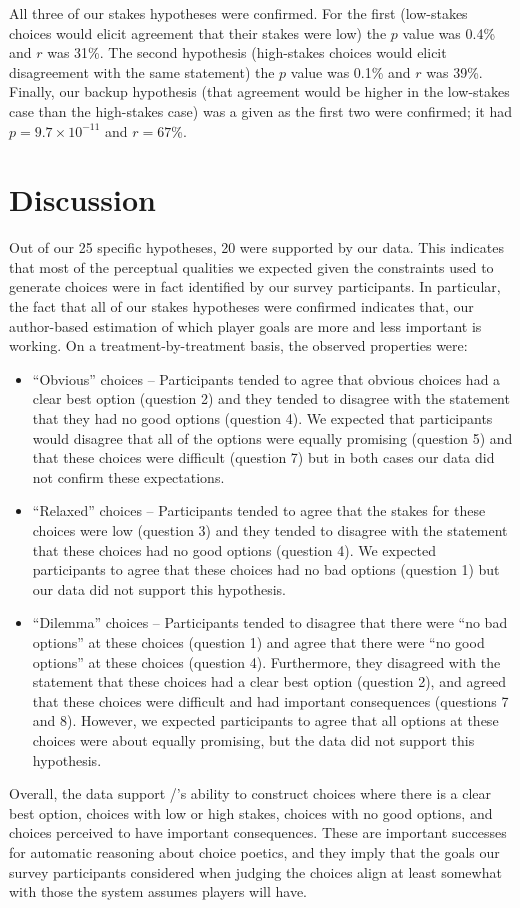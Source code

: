 All three of our stakes hypotheses were confirmed.
%
For the first (low-stakes choices would elicit agreement that their stakes were low) the $p$ value was 0.4\% and $r$ was 31\%.
%
The second hypothesis (high-stakes choices would elicit disagreement with the same statement) the $p$ value was 0.1\% and $r$ was 39\%.
%
Finally, our backup hypothesis (that agreement would be higher in the low-stakes case than the high-stakes case) was a given as the first two were confirmed; it had $p = 9.7\times10^{-11}$ and $r = 67$\%.

\section{Discussion}

Out of our 25 specific hypotheses, 20 were supported by our data.
%
This indicates that most of the perceptual qualities we expected given the constraints used to generate choices were in fact identified by our survey participants.
%
In particular, the fact that all of our stakes hypotheses were confirmed indicates that, our author-based estimation of which player goals are more and less important is working.
%
On a treatment-by-treatment basis, the observed properties were:
%
\begin{itemize}
  \item ``Obvious'' choices -- Participants tended to agree that obvious choices had a clear best option (question 2) and they tended to disagree with the statement that they had no good options (question 4). We expected that participants would disagree that all of the options were equally promising (question 5) and that these choices were difficult (question 7) but in both cases our data did not confirm these expectations.
  \item ``Relaxed'' choices -- Participants tended to agree that the stakes for these choices were low (question 3) and they tended to disagree with the statement that these choices had no good options (question 4). We expected participants to agree that these choices had no bad options (question 1) but our data did not support this hypothesis.
  \item ``Dilemma'' choices -- Participants tended to disagree that there were ``no bad options'' at these choices (question 1) and agree that there were ``no good options'' at these choices (question 4). Furthermore, they disagreed with the statement that these choices had a clear best option (question 2), and agreed that these choices were difficult and had important consequences (questions 7 and 8). However, we expected participants to agree that all options at these choices were about equally promising, but the data did not support this hypothesis.
\end{itemize}
%
Overall, the data support \dunyazad/'s ability to construct choices where there is a clear best option, choices with low or high stakes, choices with no good options, and choices perceived to have important consequences.
%
These are important successes for automatic reasoning about choice poetics, and they imply that the goals our survey participants considered when judging the choices align at least somewhat with those the system assumes players will have.


